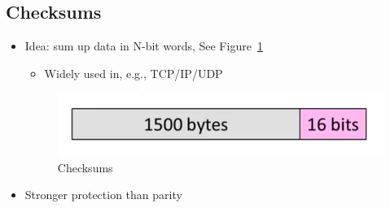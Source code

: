 \documentclass[12pt]{ctexart}   %
\begin{document}
	\subsection{Checksums}
	\begin{itemize}
		\item Idea: sum up data in N-bit words, See Figure~\ref{fig:2-9-2}
		\begin{itemize}
			\item Widely used in, e.g., TCP/IP/UDP
		\end{itemize}
		
		\begin{figure}[h!] %
		\centering
		 \includegraphics[scale=0.7]{images/2-9-2}
		\caption{Checksums}
		 \label{fig:2-9-2}
		 \end{figure}
		 
		\item Stronger protection than parity
	\end{itemize}
	
\end{document}
